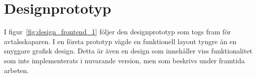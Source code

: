 \documentclass[a4paper,12pt]{article}
\begin{document}
\newpage
\section{Designprototyp} \label{appen:papper_prototyp}
\FloatBarrier
I figur~\ref{fig:design_frontend_1} följer den designprototyp som togs fram för avtalsskaparen. I en första prototyp vägde en funktionell layout tyngre än en snyggare grafisk design. Detta är även en design som innehåller viss funktionalitet som inte implementerats i nuvarande version, men som beskrivs under framtida arbeten. 

%    
\end{document}
